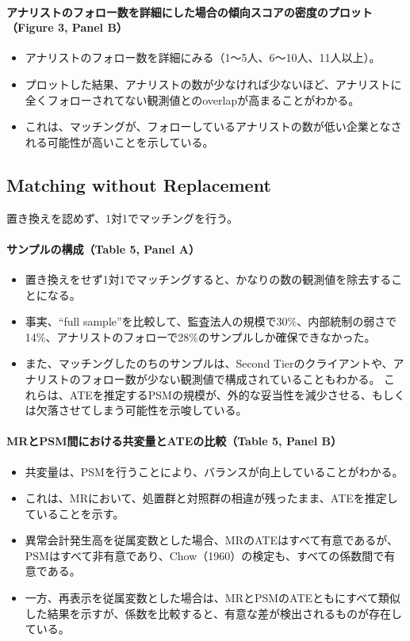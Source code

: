 \paragraph{アナリストのフォロー数を詳細にした場合の傾向スコアの密度のプロット（Figure 3, Panel B）}

\begin{itemize}
 \item アナリストのフォロー数を詳細にみる（1〜5人、6〜10人、11人以上）。
 \item プロットした結果、アナリストの数が少なければ少ないほど、アナリストに全くフォローされてない観測値とのoverlapが高まることがわかる。
 \item これは、マッチングが、フォローしているアナリストの数が低い企業となされる可能性が高いことを示している。
\end{itemize}

\subsection*{Matching without Replacement}

置き換えを認めず、1対1でマッチングを行う。

\paragraph{サンプルの構成（Table 5, Panel A）}

\begin{itemize}
 \item 置き換えをせず1対1でマッチングすると、かなりの数の観測値を除去することになる。
 \item 事実、“full sample”を比較して、監査法人の規模で30\%、内部統制の弱さで14\%、アナリストのフォローで28\%のサンプルしか確保できなかった。
 \item また、マッチングしたのちのサンプルは、Second Tierのクライアントや、アナリストのフォロー数が少ない観測値で構成されていることもわかる。
これらは、ATEを推定するPSMの規模が、外的な妥当性を減少させる、もしくは欠落させてしまう可能性を示唆している。
\end{itemize}

\paragraph{MRとPSM間における共変量とATEの比較（Table 5, Panel B）}

\begin{itemize}
 \item 共変量は、PSMを行うことにより、バランスが向上していることがわかる。
 \item これは、MRにおいて、処置群と対照群の相違が残ったまま、ATEを推定していることを示す。
 \item 異常会計発生高を従属変数とした場合、MRのATEはすべて有意であるが、PSMはすべて非有意であり、Chow（1960）の検定も、すべての係数間で有意である。
 \item 一方、再表示を従属変数とした場合は、MRとPSMのATEともにすべて類似した結果を示すが、係数を比較すると、有意な差が検出されるものが存在している。
\end{itemize}

